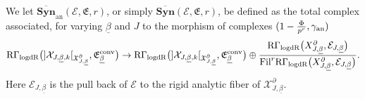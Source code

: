 \documentclass[asterisque,english]{smfart}
\begin{document}
We let $\overline{\mathbf{Syn}}_{\mathrm{an}}(\mathcal{E},\mathfrak{E},r)$, or simply $\overline{\mathbf{Syn}}(\mathcal{E},\mathfrak{E},r)$,  be defined as the total complex associated, for varying $\underline{\beta}$ and $J$  to the morphism  of complexes $(1-\frac{\Phi}{p^r},\gamma_{\rm an})$ $$\mathrm{R}\Gamma_{\mathrm{logdR}}\bigl(]\mathcal{X}_{J,\underline{\beta}, k}[_{\mathfrak{X}_{J,\underline{\beta}}^\partial},\mathfrak{E}_{\underline{\beta}}^{\rm conv}\bigr)\to\mathrm{R}\Gamma_{\mathrm{logdR}}\bigl(]\mathcal{X}_{J,\underline{\beta}, k}[_{\mathfrak{X}_{J,\underline{\beta}}^\partial},\mathfrak{E}_{\underline{\beta}}^{\rm conv}\bigr)  \oplus \frac{ \mathrm{R}\Gamma_{\mathrm{logdR}}\bigl(X_{J,\underline{\beta}}^\partial, \mathcal{E}_{J,\underline{\beta}}\bigr) }{\mathrm{Fil}^r \mathrm{R}\Gamma_{\mathrm{logdR}}\bigl(X_{J,\underline{\beta}}^\partial, \mathcal{E}_{J,\underline{\beta}}\bigr)}.$$Here $\mathcal{E}_{J,\underline{\beta}}$ is the pull back of $\mathcal{E}$ to the rigid analytic fiber of $ \mathcal{X}_{J,\underline{\beta}}^\partial$.
\end{document}
